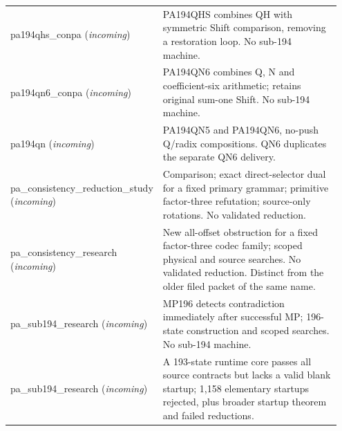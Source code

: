\begin{longtable}{@{}p{0.33\linewidth}p{0.62\linewidth}@{}}
pa194qhs\_\allowbreak{}conpa (\emph{incoming}) & PA194QHS combines QH with symmetric Shift comparison, removing a restoration loop. No sub-194 machine. \\
pa194qn6\_\allowbreak{}conpa (\emph{incoming}) & PA194QN6 combines Q, N and coefficient-six arithmetic; retains original sum-one Shift. No sub-194 machine. \\
pa194qn (\emph{incoming}) & PA194QN5 and PA194QN6, no-push Q/radix compositions. QN6 duplicates the separate QN6 delivery. \\
pa\_\allowbreak{}consistency\_\allowbreak{}reduction\_\allowbreak{}study (\emph{incoming}) & Comparison; exact direct-selector dual for a fixed primary grammar; primitive factor-three refutation; source-only rotations. No validated reduction. \\
pa\_\allowbreak{}consistency\_\allowbreak{}research (\emph{incoming}) & New all-offset obstruction for a fixed factor-three codec family; scoped physical and source searches. No validated reduction. Distinct from the older filed packet of the same name. \\
pa\_\allowbreak{}sub194\_\allowbreak{}research (\emph{incoming}) & MP196 detects contradiction immediately after successful MP; 196-state construction and scoped searches. No sub-194 machine. \\
pa\_\allowbreak{}sub194\_\allowbreak{}research (\emph{incoming}) & A 193-state runtime core passes all source contracts but lacks a valid blank startup; 1,158 elementary startups rejected, plus broader startup theorem and failed reductions. \\
\bottomrule
\end{longtable}\endgroup

